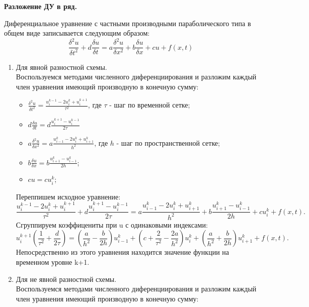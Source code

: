 \documentclass[12pt]{article}
\begin{document}
    \pagestyle{fancy} 
        \fancyhead{}
    \fancyfoot{}

    \begin{center}  \textbf{Разложение ДУ в ряд.} \end{center}
    Диференциальное уравнение с частными производными параболического типа в общем виде записывается следующим образом: 
    $$\frac{\delta^2 u}{\delta t^2}+ d\frac{\delta u}{\delta t}=a\frac{\delta^2 u}{\delta x^2}+b\frac{\delta u}{\delta x}+cu+f(x,t)$$
    \begin{enumerate}
    \item Для явной разностной схемы.
        \\Воспользуемся методами численного диференциирования и разложим каждый член уравнения имеющий производную в конечную сумму:
        \begin{itemize}
            \item $\frac{\delta^2 u}{\delta t^2} = \frac{u_{i}^{k-1}-2u_{i}^k+u_{i}^{k+1}}{\tau^2}$, где  $\tau$ - шаг по временной сетке;
            \item $d\frac{\delta u}{\delta t}=d\frac{u_i^{k+1}-u_i^{k-1}}{2\tau}$
            \item $a\frac{\delta^2 u}{\delta x^2} = a\frac{u_{i-1}^k-2u_{i}^k+u_{i+1}^k}{h^2}$, где  $h$ - шаг по пространственной сетке;
            \item $b\frac{\delta u}{\delta x} = b\frac{u_{i+1}^k-u_{i-1}^k}{2h}$;
            \item $cu = cu_{i}^k$;
        \end{itemize}
        Переппишем исходное уравнение:
        $$\frac{u_{i}^{k-1}-2u_{i}^k+u_{i}^{k+1}}{\tau^2}+d\frac{u_i^{k+1}-u_i^{k-1}}{2\tau} =a\frac{u_{i-1}^k-
        2u_{i}^k+u_{i+1}^k}{h^2}+b\frac{u_{i+1}^k-u_{i-1}^k}{2h}+cu_{i}^k+f(x,t).$$
        Сгруппируем коэффицениты при u с одинаковыми индексами:
        $$u_i^{k+1}\left(\frac{1}{\tau^2}+\frac{d}{2\tau}\right) = \left(\frac{a}{h^2}-\frac{b}{2h} \right)u_{i-1}^k + \left(c+\frac{2}{\tau^2}-\frac{2a}{h^2}\right)u_i^k +
        \left(\frac{a}{h^2}+\frac{b}{2h}\right)u_{i+1}^k +f(x,t).$$
        Непосредственно из этого уравнения находится значение функции на временном уровне k+1.
    \item Для не явной разностной схемы.
        \\Воспользуемся методами численного диференциирования и разложим каждый член уравнения имеющий производную в конечную сумму:
        \begin{itemize}

\end{itemize}
\end{enumerate}
\end{document}
